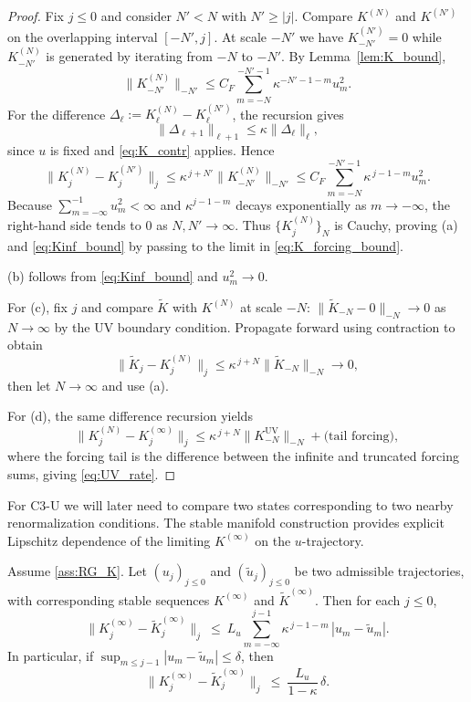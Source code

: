 \begin{proof}
Fix $j\le 0$ and consider $N'<N$ with $N'\ge |j|$.
Compare $K^{(N)}$ and $K^{(N')}$ on the overlapping interval $[-N',j]$.
At scale $-N'$ we have $K^{(N')}_{-N'}=0$ while $K^{(N)}_{-N'}$ is generated by iterating from $-N$ to $-N'$.
By Lemma~\ref{lem:K_bound},
\[
\|K^{(N)}_{-N'}\|_{-N'}\le C_F\sum_{m=-N}^{-N'-1}\kappa^{-N'-1-m}u_m^2.
\]
For the difference $\Delta_\ell:=K^{(N)}_{\ell}-K^{(N')}_{\ell}$, the recursion gives
\[
\|\Delta_{\ell+1}\|_{\ell+1}\le \kappa\|\Delta_\ell\|_\ell,
\]
since $u$ is fixed and \eqref{eq:K_contr} applies. Hence
\[
\|K^{(N)}_j-K^{(N')}_j\|_j\le \kappa^{\,j+N'}\|K^{(N)}_{-N'}\|_{-N'}
\le C_F\sum_{m=-N}^{-N'-1}\kappa^{\,j-1-m}u_m^2.
\]
Because $\sum_{m=-\infty}^{-1}u_m^2<\infty$ and $\kappa^{j-1-m}$ decays exponentially as $m\to-\infty$, the right-hand side tends to $0$ as $N,N'\to\infty$.
Thus $\{K^{(N)}_j\}_N$ is Cauchy, proving (a) and \eqref{eq:Kinf_bound} by passing to the limit in \eqref{eq:K_forcing_bound}.

(b) follows from \eqref{eq:Kinf_bound} and $u_m^2\to 0$.

For (c), fix $j$ and compare $\widetilde K$ with $K^{(N)}$ at scale $-N$:
$\|\widetilde K_{-N}-0\|_{-N}\to 0$ as $N\to\infty$ by the UV boundary condition.
Propagate forward using contraction to obtain
\[
\|\widetilde K_j-K^{(N)}_j\|_j\le \kappa^{\,j+N}\|\widetilde K_{-N}\|_{-N}\to 0,
\]
then let $N\to\infty$ and use (a).

For (d), the same difference recursion yields
\[
\|K^{(N)}_j-K^{(\infty)}_j\|_j\le \kappa^{\,j+N}\|K^{\mathrm{UV}}_{-N}\|_{-N} + \text{(tail forcing)},
\]
where the forcing tail is the difference between the infinite and truncated forcing sums, giving \eqref{eq:UV_rate}.
\end{proof}

For C3-U we will later need to compare two states corresponding to two nearby renormalization conditions.
The stable manifold construction provides explicit Lipschitz dependence of the limiting $K^{(\infty)}$ on the $u$-trajectory.

\begin{corollary}\label{cor:Lip}
Assume \ref{ass:RG_K}. Let $(u_j)_{j\le 0}$ and $(\widetilde u_j)_{j\le 0}$ be two admissible trajectories, with corresponding stable sequences
$K^{(\infty)}$ and $\widetilde K^{(\infty)}$.
Then for each $j\le 0$,
\begin{equation}\label{eq:Lip_uK}
\|K^{(\infty)}_j-\widetilde K^{(\infty)}_j\|_j
\ \le\ L_u\sum_{m=-\infty}^{j-1}\kappa^{\,j-1-m}\,|u_m-\widetilde u_m|.
\end{equation}
In particular, if $\sup_{m\le j-1}|u_m-\widetilde u_m|\le \delta$, then
\[
\|K^{(\infty)}_j-\widetilde K^{(\infty)}_j\|_j\ \le\ \frac{L_u}{1-\kappa}\,\delta.
\]
\end{corollary}

